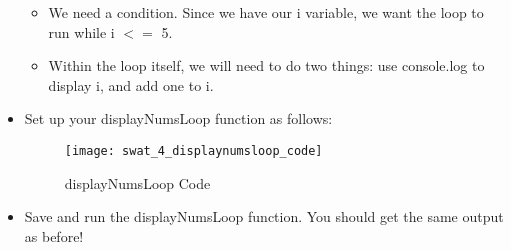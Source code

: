 \documentclass{article}
\begin{document}
\begin{itemize}
\begin{itemize}
		\item We need a condition.  Since we have our i variable, we want the loop to run while i $<=$ 5.
		\item Within the loop itself, we will need to do two things:  use console.log to display i, and add one to i.
	\end{itemize}
	\item Set up your displayNumsLoop function as follows:
	\begin{figure}[H]
  		\centering
  		\texttt{[image: swat\_4\_displaynumsloop\_code]}
  		\caption{displayNumsLoop Code}
	\end{figure}
	\item Save and run the displayNumsLoop function.  You should get the same output as before!
\end{itemize}
\end{document}

